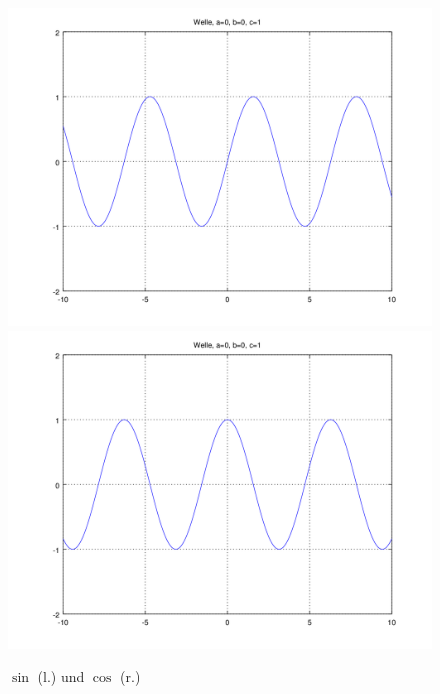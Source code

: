 \begin{figure}
	\includegraphics[scale=0.35]{./wellen/images/basicfunctions/sin.png}
	\includegraphics[scale=0.35]{./wellen/images/basicfunctions/cos.png}
	\caption{$\sin$ (l.) und $\cos$ (r.)}
	\label{fig:wellen:sin-cos}
\end{figure}

